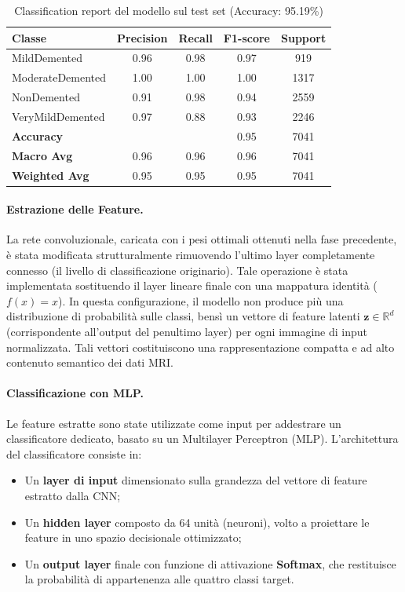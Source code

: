 \begin{table}[H]
\centering
\begin{tabular}{lcccc}
\hline
\textbf{Classe} & \textbf{Precision} & \textbf{Recall} & \textbf{F1-score} & \textbf{Support} \\
\hline
MildDemented      & 0.96 & 0.98 & 0.97 & 919  \\
ModerateDemented  & 1.00 & 1.00 & 1.00 & 1317 \\
NonDemented       & 0.91 & 0.98 & 0.94 & 2559 \\
VeryMildDemented  & 0.97 & 0.88 & 0.93 & 2246 \\
\hline
\textbf{Accuracy}     &      &      & 0.95 & 7041 \\
\textbf{Macro Avg}    & 0.96 & 0.96 & 0.96 & 7041 \\
\textbf{Weighted Avg} & 0.95 & 0.95 & 0.95 & 7041 \\
\hline
\end{tabular}
\caption{Classification report del modello sul test set (Accuracy: 95.19\%)}
\label{tab:classification_report_validation}
\end{table}

\paragraph{Estrazione delle Feature.}
La rete convoluzionale, caricata con i pesi ottimali ottenuti nella fase precedente, è stata modificata strutturalmente rimuovendo l'ultimo layer completamente connesso (il livello di classificazione originario). Tale operazione è stata implementata sostituendo il layer lineare finale con una mappatura identità ($f(x) = x$).
In questa configurazione, il modello non produce più una distribuzione di probabilità sulle classi, bensì un vettore di feature latenti $\mathbf{z} \in \mathbb{R}^d$ (corrispondente all'output del penultimo layer) per ogni immagine di input normalizzata. Tali vettori costituiscono una rappresentazione compatta e ad alto contenuto semantico dei dati MRI.

\paragraph{Classificazione con MLP.}
Le feature estratte sono state utilizzate come input per addestrare un classificatore dedicato, basato su un Multilayer Perceptron (MLP). L'architettura del classificatore consiste in:
\begin{itemize}
    \item Un \textbf{layer di input} dimensionato sulla grandezza del vettore di feature estratto dalla CNN;
    \item Un \textbf{hidden layer} composto da 64 unità (neuroni), volto a proiettare le feature in uno spazio decisionale ottimizzato;
    \item Un \textbf{output layer} finale con funzione di attivazione \textbf{Softmax}, che restituisce la probabilità di appartenenza alle quattro classi target.
\end{itemize}

